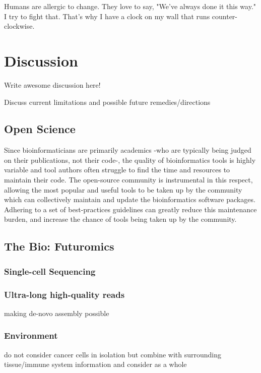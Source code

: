 \begin{savequote}[75mm]
Humans are allergic to change. They love to say, "We've always done it this way." I try to fight that. That's why I have a clock on my wall that runs counter-clockwise.
\end{savequote}

\chapter{Discussion}
\label{discussion}
\setcounter{figure}{-1}
\setcounter{table}{-1}
\setcounter{section}{-1}
\setcounter{NAT@ctr}{-1}

Write awesome discussion here!

Discuss current limitations and possible future remedies/directions

\section{Open Science}
Since bioinformaticians are primarily academics -who are typically being judged on their publications, not their code-, the quality of bioinformatics tools is highly variable and tool authors often struggle to find the time and resources to maintain their code. The open-source community is instrumental in this respect, allowing the most popular and useful tools to be taken up by the community which can collectively maintain and update the bioinformatics software packages. Adhering to a set of best-practices guidelines can greatly reduce this maintenance burden, and increase the chance of tools being taken up by the community.


\section{The Bio: Futuromics}

\subsection{Single-cell Sequencing}

\subsection{Ultra-long high-quality reads}
making de-novo assembly possible

\subsection{Environment}
do not consider cancer cells in isolation but combine with surrounding tissue/immune system information and consider as a whole


